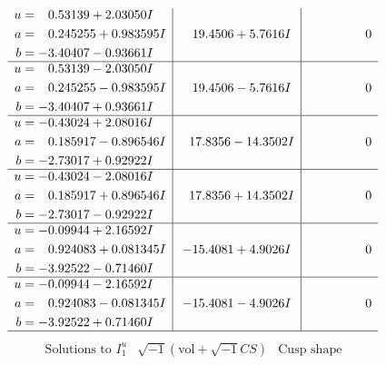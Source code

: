 \documentclass[1p]{elsarticle_modified}
\theoremstyle{definition}
\newcommand{\I}{\sqrt{-1}}
\begin{document}
$$\begin{array}{c|c|c}
\begin{aligned}
u &= \phantom{-}0.53139 + 2.03050 I \\
a &= \phantom{-}0.245255 + 0.983595 I \\
b &= -3.40407 - 0.93661 I\end{aligned}
 & \phantom{-}19.4506 + 5.7616 I & \phantom{-0.000000 } 0 \\ \hline\begin{aligned}
u &= \phantom{-}0.53139 - 2.03050 I \\
a &= \phantom{-}0.245255 - 0.983595 I \\
b &= -3.40407 + 0.93661 I\end{aligned}
 & \phantom{-}19.4506 - 5.7616 I & \phantom{-0.000000 } 0 \\ \hline\begin{aligned}
u &= -0.43024 + 2.08016 I \\
a &= \phantom{-}0.185917 - 0.896546 I \\
b &= -2.73017 + 0.92922 I\end{aligned}
 & \phantom{-}17.8356 - 14.3502 I & \phantom{-0.000000 } 0 \\ \hline\begin{aligned}
u &= -0.43024 - 2.08016 I \\
a &= \phantom{-}0.185917 + 0.896546 I \\
b &= -2.73017 - 0.92922 I\end{aligned}
 & \phantom{-}17.8356 + 14.3502 I & \phantom{-0.000000 } 0 \\ \hline\begin{aligned}
u &= -0.09944 + 2.16592 I \\
a &= \phantom{-}0.924083 + 0.081345 I \\
b &= -3.92522 - 0.71460 I\end{aligned}
 & -15.4081 + 4.9026 I & \phantom{-0.000000 } 0 \\ \hline\begin{aligned}
u &= -0.09944 - 2.16592 I \\
a &= \phantom{-}0.924083 - 0.081345 I \\
b &= -3.92522 + 0.71460 I\end{aligned}
 & -15.4081 - 4.9026 I & \phantom{-0.000000 } 0\\
 \hline 
 \end{array}$$\newpage$$\begin{array}{c|c|c}  
\text{Solutions to }I^u_{1}& \I (\text{vol} + \sqrt{-1}CS) & \text{Cusp shape}\\
 \hline 
\begin{aligned}

\end{aligned}
\end{array}$$
\end{document}
